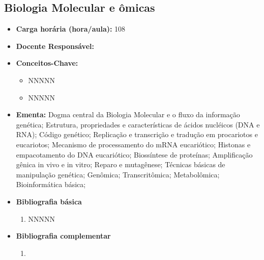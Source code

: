 \documentclass[11pt,fleqn]{book} %
\begin{document}
\newpage
\subsection{Biologia Molecular e ômicas}\label{disc:biomol}
\begin{itemize}
	\item \textbf{Carga horária (hora/aula):} 108
	\item \textbf{Docente Responsável:}
	\item \textbf{Conceitos-Chave:}
	\begin{itemize}
		\item NNNNN
		\item NNNNN
	\end{itemize}
	\item \textbf{Ementa:} Dogma central da Biologia Molecular e o fluxo da informação genética;
	Estrutura, propriedades e características de ácidos nucléicos (DNA e RNA);
	Código genético; 
	Replicação e transcrição e tradução em procariotos e eucariotos;
	Mecanismo de processamento do mRNA eucariótico; 
	Histonas e empacotamento do DNA eucariótico; 
	Biossíntese de proteínas; 
	Amplificação gênica in vivo e in vitro; 
	Reparo e mutagênese;
	Técnicas básicas de manipulação genética;
	Genômica;
	Transcritômica;
	Metabolômica;
	Bioinformática básica;
	\item \textbf{Bibliografia básica}
	\begin{enumerate}
		\item NNNNN
	\end{enumerate}
	\item \textbf{Bibliografia complementar}
	\begin{enumerate}
		\item 
	\end{enumerate}	
\end{itemize}

\newpage
\end{document}
